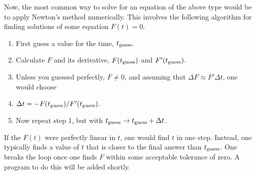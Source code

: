 \documentclass[letterpaper,10pt,english]{sphinxmanual}
\begin{document}
Now, the most common way to solve for an equation of the above type
would be to apply Newton’s method numerically. This involves the
following algorithm for finding solutions of some equation \(F(t)=0\).
\begin{enumerate}
%
\item {} 
First guess a value for the time, \(t_{\rm guess}\).

\item {} 
Calculate \(F\) and its derivative, \(F(t_{\rm guess})\) and \(F'(t_{\rm guess})\).

\item {} 
Unless you guessed perfectly, \(F\ne 0\), and assuming that \(\Delta F\approx F'\Delta t\), one would choose

\item {} 
\(\Delta t=-F(t_{\rm guess})/F'(t_{\rm guess})\).

\item {} 
Now repeat step 1, but with \(t_{\rm guess}\rightarrow t_{\rm guess}+\Delta t\).

\end{enumerate}

If the \(F(t)\) were perfectly linear in \(t\), one would find \(t\) in one
step. Instead, one typically finds a value of \(t\) that is closer to
the final answer than \(t_{\rm guess}\). One breaks the loop once one
finds \(F\) within some acceptable tolerance of zero. A program to do
this will be added shortly.
\end{document}
